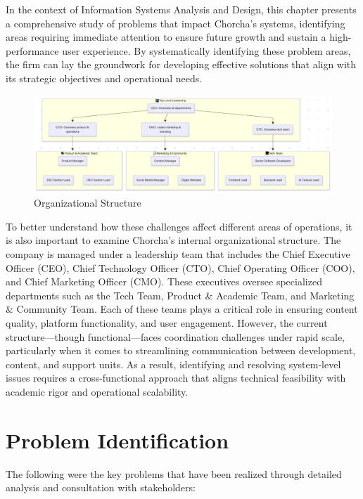 \documentclass[12pt,a4paper,oneside]{book}
\begin{document}
In the context of Information Systems Analysis and Design, this chapter presents a comprehensive study of problems that impact Chorcha's systems, identifying areas requiring immediate attention to ensure future growth and sustain a high-performance user experience. By systematically identifying these problem areas, the firm can lay the groundwork for developing effective solutions that align with its strategic objectives and operational needs.

\begin{figure}[H]
    \centering
    \includegraphics[width=1.0\textwidth]{flowChart4.png}
    \caption{Organizational Structure}
\end{figure}

To better understand how these challenges affect different areas of operations, it is also important to examine Chorcha's internal organizational structure. The company is managed under a leadership team that includes the Chief Executive Officer (CEO), Chief Technology Officer (CTO), Chief Operating Officer (COO), and Chief Marketing Officer (CMO). These executives oversee specialized departments such as the Tech Team, Product \& Academic Team, and Marketing \& Community Team. Each of these teams plays a critical role in ensuring content quality, platform functionality, and user engagement. However, the current structure—though functional—faces coordination challenges under rapid scale, particularly when it comes to streamlining communication between development, content, and support units. As a result, identifying and resolving system-level issues requires a cross-functional approach that aligns technical feasibility with academic rigor and operational scalability.

\newpage

\section{Problem Identification}
The following were the key problems that have been realized through detailed analysis and consultation with stakeholders:
\end{document}
